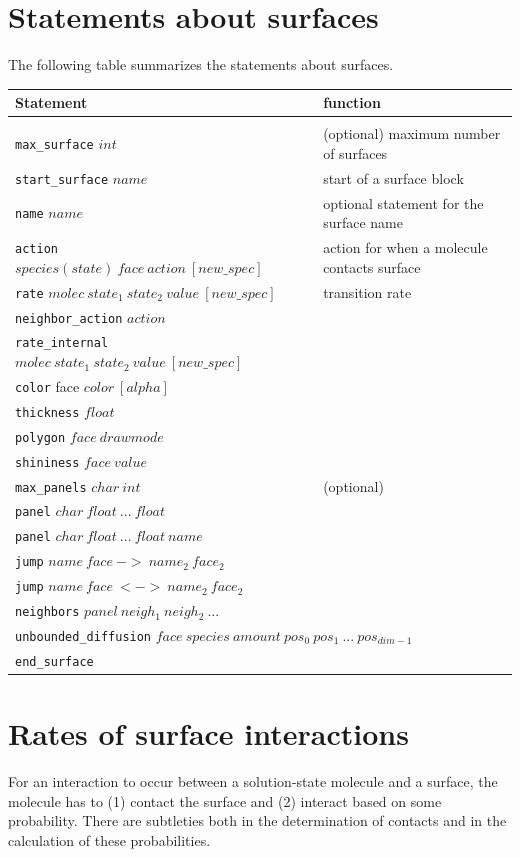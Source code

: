 \documentclass {book}
\newcommand {\ttt} {\texttt}
\begin{document}
\section{Statements about surfaces}

The following table summarizes the statements about surfaces.

\begin{longtable}[c]{ll}
Statement & function\\
\hline\\
\ttt{max\_surface} $int$ & (optional) maximum number of surfaces\\
\ttt{start\_surface} $name$ & start of a surface block\\
\ttt{name} $name$ & optional statement for the surface name\\
\ttt{action} $species(state)\ face\ action\ [new\_spec]$ & action for when a molecule contacts surface\\
\ttt{rate} $molec\ state_1\ state_2\ value\ [new\_spec]$ & transition rate\\
\ttt{neighbor\_action} $action$\\
\ttt{rate\_internal} $molec\ state_1\ state_2\ value\ [new\_spec]$\\
\ttt{color} face $color\ [alpha]$\\
\ttt{thickness} $float$\\
\ttt{polygon} $face\ drawmode$\\
\ttt{shininess} $face\ value$\\
\ttt{max\_panels} $char\ int$ & (optional)\\
\ttt{panel} $char\ float\ ...\ float$\\
\ttt{panel} $char\ float\ ...\ float\ name$\\
\ttt{jump} $name\ face\ ->\ name_2\ face_2$\\
\ttt{jump} $name\ face\ <->\ name_2\ face_2$\\
\ttt{neighbors} $panel\ neigh_1\ neigh_2\ ...$\\
\multicolumn{2}{l}{
\ttt{unbounded\_diffusion} $face\ species\ amount\ pos_0\ pos_1\ ...\ pos_{dim-1}$}\\
\ttt{end\_surface}
\end{longtable}

\section{Rates of surface interactions}

For an interaction to occur between a solution-state molecule and a surface, the molecule has to (1) contact the surface and (2) interact based on some probability. There are subtleties both in the determination of contacts and in the calculation of these probabilities.
\end{document}
